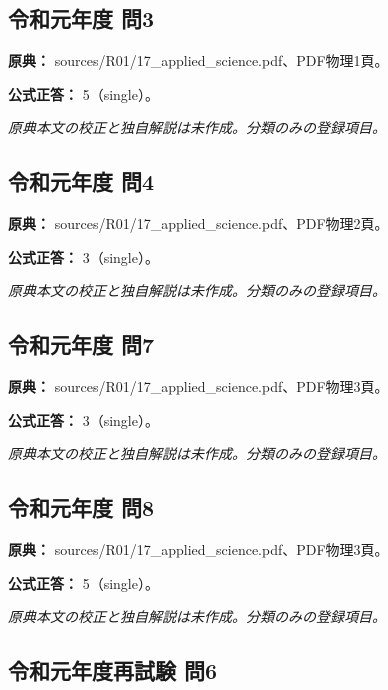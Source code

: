 \subsection{令和元年度 問3}
\label{q:r01-reg-applied-03}

\noindent\textbf{原典：} sources/R01/17\_applied\_science.pdf、PDF物理1頁。

\textbf{公式正答：} 5（single）。

\par\textit{原典本文の校正と独自解説は未作成。分類のみの登録項目。}

\subsection{令和元年度 問4}
\label{q:r01-reg-applied-04}

\noindent\textbf{原典：} sources/R01/17\_applied\_science.pdf、PDF物理2頁。

\textbf{公式正答：} 3（single）。

\par\textit{原典本文の校正と独自解説は未作成。分類のみの登録項目。}

\subsection{令和元年度 問7}
\label{q:r01-reg-applied-07}

\noindent\textbf{原典：} sources/R01/17\_applied\_science.pdf、PDF物理3頁。

\textbf{公式正答：} 3（single）。

\par\textit{原典本文の校正と独自解説は未作成。分類のみの登録項目。}

\subsection{令和元年度 問8}
\label{q:r01-reg-applied-08}

\noindent\textbf{原典：} sources/R01/17\_applied\_science.pdf、PDF物理3頁。

\textbf{公式正答：} 5（single）。

\par\textit{原典本文の校正と独自解説は未作成。分類のみの登録項目。}

\subsection{令和元年度再試験 問6}
\label{q:r01-ret-applied-06}


